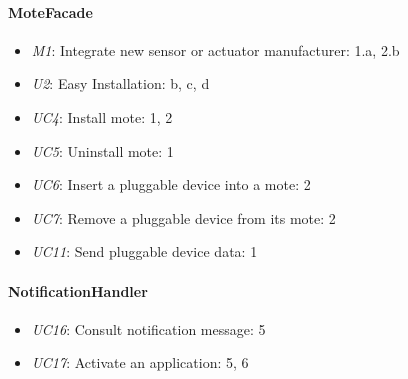     \paragraph{MoteFacade}
        \begin{itemize}
            \item \emph{M1}: Integrate new sensor or actuator manufacturer: 1.a, 2.b
            \item \emph{U2}: Easy Installation: b, c, d
            \item \emph{UC4}: Install mote: 1, 2
            \item \emph{UC5}: Uninstall mote: 1
            \item \emph{UC6}: Insert a pluggable device into a mote: 2
            \item \emph{UC7}: Remove a pluggable device from its mote: 2
            \item \emph{UC11}: Send pluggable device data: 1
        \end{itemize}

    \paragraph{NotificationHandler}
        \begin{itemize}
            \item \emph{UC16}: Consult notification message: 5
            \item \emph{UC17}: Activate an application: 5, 6
        \end{itemize}

